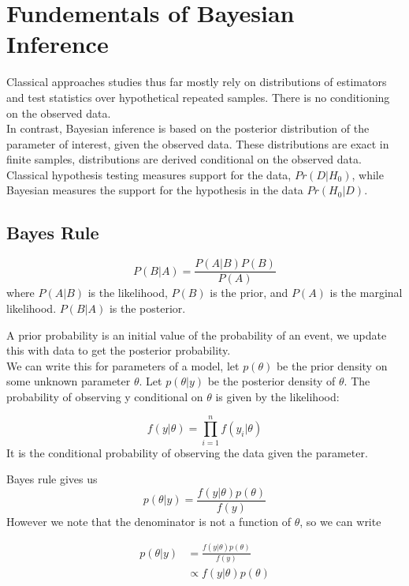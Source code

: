 \documentclass[DIV=14,titlepage=false]{scrreprt}
\begin{document}
\vspace{-10pt}
\setcounter{chapter}{7}


\chapter{Fundementals of Bayesian Inference}
Classical approaches studies thus far mostly rely on distributions of estimators and test statistics over hypothetical repeated samples. There is no conditioning on the observed data.\\
In contrast, Bayesian inference is based on the posterior distribution of the parameter of interest, given the observed data. These distributions are exact in finite samples, distributions are derived conditional on the observed data.\\
Classical hypothesis testing measures support for the data, $Pr(D|H_0)$, while Bayesian measures the support for the hypothesis in the data $Pr(H_0|D)$.
\section{Bayes Rule}
\begin{definition}
    \[
        P(B|A) = \frac{P(A|B)P(B)}{P(A)}
    \]
    where $P(A|B)$ is the likelihood, $P(B)$ is the prior, and $P(A)$ is the marginal likelihood. $P(B|A)$ is the posterior.
\end{definition}
A prior probability is an initial value of the probability of an event, we update this with data to get the posterior probability.\\
We can write this for parameters of a model, let $p(\theta)$ be the prior density on some unknown parameter $\theta$. Let $p(\theta|y)$ be the posterior density of $\theta$. The probability of observing y conditional on $\theta$ is given by the likelihood:
\begin{definition}
    \[
    f(y|\theta)=\prod_{i=1}^n f(y_i|\theta)
\]
It is the conditional probability of observing the data given the parameter.
\end{definition}
Bayes rule gives us
\[
    p(\theta|y) = \frac{f(y|\theta)p(\theta)}{f(y)}
\]
However we note that the denominator is not a function of $\theta$, so we can write
\begin{definition}
    \begin{align*}
        p(\theta|y) &= \frac{f(y|\theta)p(\theta)}{f(y)}\\
        &\propto f(y|\theta)p(\theta)
    \end{align*}
\end{definition}
\end{document}
